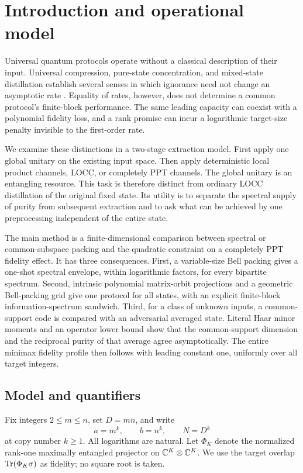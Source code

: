 \section{Introduction and operational model}

Universal quantum protocols operate without a classical description of their input. Universal compression, pure-state concentration, and mixed-state distillation establish several senses in which ignorance need not change an asymptotic rate \cite{jhhh,hm,takagi,tirone,llf,rizzo}. Equality of rates, however, does not determine a common protocol's finite-block performance. The same leading capacity can coexist with a polynomial fidelity loss, and a rank promise can incur a logarithmic target-size penalty invisible to the first-order rate.

We examine these distinctions in a two-stage extraction model. First apply one global unitary on the existing input space. Then apply deterministic local product channels, LOCC, or completely PPT channels. The global unitary is an entangling resource. This task is therefore distinct from ordinary LOCC distillation of the original fixed state. Its utility is to separate the spectral supply of purity from subsequent extraction and to ask what can be achieved by one preprocessing independent of the entire state.

The main method is a finite-dimensional comparison between spectral or common-subspace packing and the quadratic constraint on a completely PPT fidelity effect. It has three consequences. First, a variable-size Bell packing gives a one-shot spectral envelope, within logarithmic factors, for every bipartite spectrum. Second, intrinsic polynomial matrix-orbit projections and a geometric Bell-packing grid give one protocol for all states, with an explicit finite-block information-spectrum sandwich. Third, for a class of unknown inputs, a common-support code is compared with an adversarial averaged state. Literal Haar minor moments and an operator lower bound show that the common-support dimension and the reciprocal purity of that average agree asymptotically. The entire minimax fidelity profile then follows with leading constant one, uniformly over all target integers.

\subsection{Model and quantifiers}
Fix integers $2\le m\le n$, set $D=mn$, and write
\[
 a=m^k,\qquad b=n^k,\qquad N=D^k
\]
at copy number $k\ge1$. All logarithms are natural. Let $\Phi_K$ denote the normalized rank-one maximally entangled projector on $\mathbb C^K\otimes\mathbb C^K$. We use the target overlap $\operatorname{Tr}(\Phi_K\sigma)$ as fidelity; no square root is taken.

